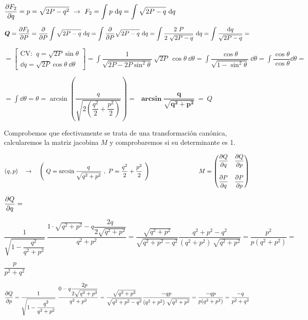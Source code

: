 $\displaystyle \pdv{F_2}{q} = p = \sqrt{2P-q^2}  \ \to \ F_2=\int p \ \dd q=\int  \sqrt{2P-q} \ \dd q$

$\displaystyle \boldsymbol{Q}= \pdv{F_2}{P}=\pdv{P} \int  \sqrt{2P-q} \ \dd q= \int \pdv{P} \sqrt{2P-q} \ \dd q = \int \dfrac {2 \ P}{2 \ \sqrt{2P-q}} \ \dd q = \int \dfrac {\dd q} { \sqrt{2P-q} } =$

$=\displaystyle \left[ \begin{matrix} \text{CV: } \ q=\sqrt{2P} \sin \theta \\ \dd q  =  \sqrt{2P}  \cos \theta  \ \dd \theta \end{matrix} \right] = \int \dfrac 1{\sqrt{2P-2P\sin^2 \theta}} \ \sqrt{2P} \ \cos \theta \ \dd \theta=
\int \dfrac{\cos \theta}{\sqrt{1-\sin^2\theta}} \ \dd \theta = \int \dfrac{\cos \theta}{\cos \theta} \dd \theta =$

$\displaystyle = \int \dd \theta = \theta = \arcsin \left( \dfrac q {\sqrt{2\left( \dfrac {q^2}{2} + \dfrac {p^2}{2} \right) } } \right) = \ \boxed{ \ \boldsymbol{ \arcsin \dfrac{q}{\sqrt{q^2+p^2}}} \ = \ Q \ }$

\vspace{5mm} Comprobemos que efectivamente se trata de una transformación canónica, calcularemos la matriz jacobina $M$ y comprobaremos si su determinante es 1.

\vspace{5mm} $(q,p) \quad \to \quad \left( \ Q=\arcsin \dfrac{q}{\sqrt{q^2+p^2}}\ , \ P =\dfrac{q^2}2 + \dfrac{p^2}2 \ \right) \qquad \qquad  \qquad \qquad M=\mqty( \displaystyle \pdv{Q}{q} & \displaystyle \pdv{Q}{p} \\ \\ \displaystyle \pdv{P}{q} & \displaystyle \pdv{P}{p} ) $

$\displaystyle \pdv{Q}{q}= $
\begin{footnotesize} $\dfrac 
{ 1 }  
{ \sqrt{1-\dfrac{q^2}{q^2+p^2}} } \ 
\dfrac 
{1\cdot \sqrt{q^2+p^2} - q\dfrac{2q}{2\sqrt{q^2+p^2}}}
{q^2+p^2} = 
\dfrac{\sqrt{q^2+p^2}}{\sqrt{q^2+p^2-q^2}} \dfrac{q^2+p^2-q^2}{(q^2+p^2)\ \sqrt{q^2+p^2} } = \dfrac{p^2}{p(q^2+p^2)}= $\end{footnotesize}
$ \dfrac{p}{p^2+q^2}$



$\displaystyle \pdv{Q}{p}=
\dfrac 
{ 1 }  
{ \sqrt{1-\dfrac{q^2}{q^2+p^2}} } \ 
\dfrac 
{0 - q\dfrac{2p}{2\sqrt{q^2+p^2}}}
{q^2+p^2} =   
\dfrac{\sqrt{q^2+p^2}}{\sqrt{q^2+p^2-q^2}} 
\dfrac{-qp}{(q^2+p^2)\ \sqrt{q^2+p^2}} = \dfrac{-qp}{p(q^2+p^2)}=\dfrac{-q}{p^2+q^2}$

